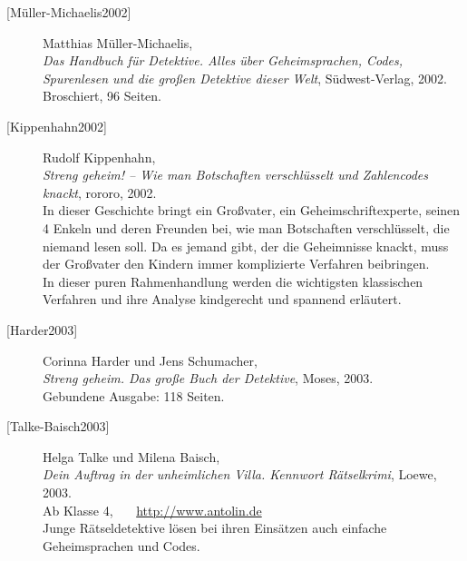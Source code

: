 \begin{refsegment}
\begin{description}
\item[\textrm{[Müller-Michaelis2002]}] 
    Matthias Müller-Michaelis, \\
    {\em Das Handbuch für Detektive. Alles über Geheimsprachen, Codes,
     Spurenlesen und die großen Detektive dieser Welt}, Südwest-Verlag, 2002.\\
    Broschiert, 96 Seiten.\\


\item[\textrm{[Kippenhahn2002]}] 
    Rudolf Kippenhahn, \\
    {\em Streng geheim! -- Wie man Botschaften verschlüsselt und
    Zahlencodes knackt}, rororo, 2002. \\
    In dieser Geschichte bringt ein Großvater, ein Geheimschriftexperte,
    seinen 4 Enkeln und deren Freunden bei, wie man Botschaften
    verschlüsselt, die niemand lesen soll. Da es jemand gibt, der die
    Geheimnisse knackt, muss der Großvater den Kindern immer komplizierte
    Verfahren beibringen. \\
    In dieser puren Rahmenhandlung werden die wichtigsten klassischen
    Verfahren und ihre Analyse kindgerecht und spannend erläutert.\\


\item[\textrm{[Harder2003]}] 
    Corinna Harder und Jens Schumacher, \\
    {\em Streng geheim. Das große Buch der Detektive}, Moses, 2003. \\
    Gebundene Ausgabe: 118 Seiten.\\


\item[\textrm{[Talke-Baisch2003]}] 
    Helga Talke und Milena Baisch, \\
    {\em Dein Auftrag in der unheimlichen Villa. Kennwort Rätselkrimi},
    Loewe, 2003. \\
    Ab Klasse 4, ~~~\url{http://www.antolin.de}\\
    Junge Rätseldetektive lösen bei ihren Einsätzen auch einfache
    Geheimsprachen und Codes.\\



\end{description}
\end{refsegment}
